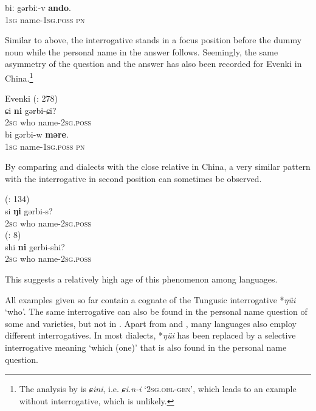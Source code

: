 \documentclass[output=paper,colorlinks,citecolor=brown]{langscibook}
\begin{document}
    \ex
    \gll biː		gərbiː-v			\textbf{ando}.\\
    1\textsc{sg}		name-1\textsc{sg.poss}		\textsc{pn}\\
    \z
\z

\noindent Similar to  above, the interrogative stands in a focus position before the dummy noun while the personal name in the answer follows. Seemingly, the same asymmetry of the question and the answer has also been recorded for  Evenki in China.\footnote{The analysis by \citet[278]{Hasibateer2016H} is \textit{ɕini}, i.e. \textit{ɕi.n-i} `2\textsc{sg.obl-gen}', which leads to an example without interrogative, which is unlikely.}\largerpage[-1]

\ea
    \label{example4.63}
     Evenki (\citealt{Hasibateer2016H}: 278)\\
    \ea
    \gll ɕi		\textbf{ni}		gərbi-ɕi?\\
    2\textsc{sg}		who		name-2\textsc{sg.poss}\\

    \ex
    \gll bi		gərbi-w			\textbf{məre}.\\
    1\textsc{sg}		name-1\textsc{sg.poss}		\textsc{pn}\\
    \z
\z

By comparing  and  dialects with the close relative  in China, a very similar pattern with the interrogative in second position can sometimes be observed.

\ea
    \label{example4.64}
     (\citealt{Boldyrev2000}: 134)\\
    \gll si		\textbf{ŋi}		gərbi-s?\\
    2\textsc{sg}		who		name-2\textsc{sg.poss}\\
\ex
    \label{example4.65}
     (\citealt{Chaoke2014aH}: 8)\\
    \gll shi		\textbf{ni}		gerbi-shi?\\
    2\textsc{sg}		who		name-2\textsc{sg.poss}\\
\z

\noindent This suggests a relatively high age of this phenomenon among  languages.

All examples given so far contain a cognate of the Tungusic interrogative *\textit{ŋüi} ‘who’. The same interrogative can also be found in the personal name question of some  and  varieties, but not in . Apart from  and , many  languages also employ different interrogatives. In most  dialects, *\textit{ŋüi} has been replaced by a selective interrogative meaning ‘which (one)’ that is also found in the personal name question.
\end{document}
